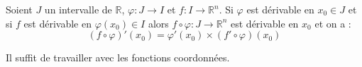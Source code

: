 \documentclass[a4paper,10pt]{report}
\begin{document}
%
%
%
%

\begin{prop}[composition] Soient $J$ un intervalle de $\mathbb{R}$, $\varphi : J \rightarrow I$ et $f : I \rightarrow \mathbb{R}^n$. Si $\varphi$ est dérivable en $x_0 \in J$ et si $f$ est dérivable en $\varphi(x_0) \in I$ alors $f \circ \varphi : J \rightarrow \mathbb{R}^n$ est dérivable en $x_0$ et on a :
$$ (f \circ \varphi)'(x_0) = \varphi'(x_0) \times (f' \circ \varphi)(x_0)$$
\end{prop}

\begin{preuve} Il suffit de travailler avec les fonctions coordonnées.
\end{preuve}

\end{document}
